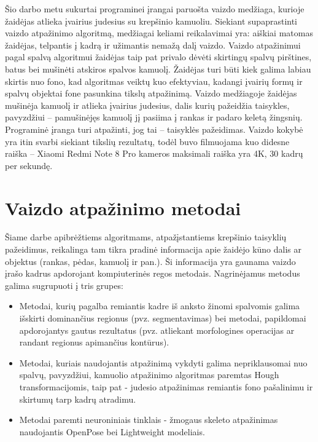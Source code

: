 \documentclass{VUMIFPSbakalaurinis}
\begin{document}
Šio darbo metu sukurtai programinei įrangai paruošta vaizdo medžiaga, kurioje žaidėjas atlieka įvairius judesius su krepšinio kamuoliu. Siekiant supaprastinti vaizdo atpažinimo algoritmą, medžiagai keliami reikalavimai yra: aiškiai matomas žaidėjas, telpantis į kadrą ir užimantis nemažą dalį vaizdo. Vaizdo atpažinimui pagal spalvą algoritmui žaidėjas taip pat privalo dėvėti skirtingų spalvų pirštines, batus bei mušinėti atskiros spalvos kamuolį. Žaidėjas turi būti kiek galima labiau skirtis nuo fono, kad algoritmas veiktų kuo efektyviau, kadangi įvairių formų ir spalvų objektai fone pasunkina tikslų atpažinimą. Vaizdo medžiagoje žaidėjas mušinėja kamuolį ir atlieka įvairius judesius, dalis kurių pažeidžia taisykles, pavyzdžiui – pamušinėjęs kamuolį jį pasiima į rankas ir padaro keletą žingsnių. Programinė įranga turi atpažinti, jog tai – taisyklės pažeidimas. Vaizdo kokybė yra itin svarbi siekiant tikslių rezultatų, todėl buvo filmuojama kuo didesne raiška – Xiaomi Redmi Note 8 Pro kameros maksimali raiška yra 4K, 30 kadrų per sekundę. 

\section{Vaizdo atpažinimo metodai}

Šiame darbe apibrėžtiems algoritmams, atpažįstantiems krepšinio taisyklių pažeidimus, reikalinga tam tikra pradinė informacija apie žaidėjo kūno dalis ar objektus (rankas, pėdas, kamuolį ir pan.). Ši informacija yra gaunama vaizdo įrašo kadrus apdorojant kompiuterinės regos metodais. 
Nagrinėjamus metodus galima sugrupuoti į tris grupes: 

\begin{itemize}
	\item Metodai, kurių pagalba remiantis kadre iš anksto žinomi spalvomis galima išskirti dominančius regionus (pvz. segmentavimas) bei metodai, papildomai apdorojantys gautus rezultatus (pvz. atliekant morfologines operacijas ar randant regionus apimančius kontūrus).
	\item Metodai, kuriais naudojantis atpažinimą vykdyti galima nepriklausomai nuo spalvų, pavyzdžiui, kamuolio atpažinimo algoritmas paremtas Hough transformacijomis, taip pat - judesio atpažinimas remiantis fono pašalinimu ir skirtumų tarp kadrų atradimu.
	\item Metodai paremti neuroniniais tinklais - žmogaus skeleto atpažinimas naudojantis OpenPose bei Lightweight modeliais. 
\end{itemize}
\end{document}
